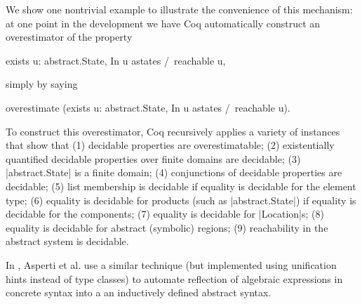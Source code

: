 \documentclass[runningheads]{llncs}
\begin{document}
{We show one nontrivial example to illustrate the convenience of this mechanism: at one point in the development we have Coq automatically construct an overestimator of the property
\begin{code}
  exists u: abstract.State, In u astates /\ reachable u,
\end{code}
simply by saying
\begin{code}
  overestimate (exists u: abstract.State, In u astates /\ reachable u).
\end{code}
To construct this overestimator, Coq recursively applies a variety of
instances that show that (1) decidable properties are overestimatable;
(2) existentially quantified decidable properties over finite domains
are decidable; (3) |abstract.State| is a finite domain; (4)
conjunctions of decidable properties are decidable; (5) list
membership is decidable if equality is decidable for the element type;
(6) equality is decidable for products (such as |abstract.State|) if
equality is decidable for the components; (7) equality is decidable
for |Location|s; (8) equality is decidable for abstract (symbolic)
regions; (9) reachability in the abstract system is decidable.

In \cite{hintsinunification}, Asperti et al. use a similar technique
(but implemented using unification hints instead of type classes) to
automate reflection of algebraic expressions in concrete syntax into a
an inductively defined abstract syntax.
}
\end{document}
